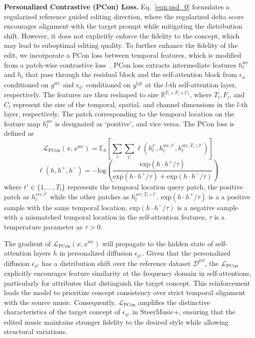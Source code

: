 \textbf{Personalized Contrastive (PCon) Loss.}
Eq.~\ref{eqn:psd_0} formulates a regularized reference guided editing direction, where the regularized delta score encourages alignment with the target prompt while mitigating the distribution shift.
However, it does not explicitly enforce the fidelity to the concept, which may lead to suboptimal editing quality.
To further enhance the fidelity of the edit, 
we incorporate a PCon loss between temporal features, which is modified from a patch-wise contrastive loss~\cite{nam2024contrastive}. PCon loss extracts intermediate features $h^{\text{src}}_l$ and $h_l$ that pass through the residual block and the self-attention block from $\epsilon_{\phi}$ conditioned on $y^{\text{src}}$ and $\epsilon_{\phi '}$ conditioned on $y^{\text{tgt}}$ at the $l$-th self-attention layer, respectively. The features are then reshaped to size $\mathbb{R}^{T_l \times F_l \times C_l}$, where $T_l,F_l$, and $C_l$ represent the size of the temporal, spatial, and channel dimensions in the $l$-th layer, respectively. The patch corresponding to the temporal location on the feature map $h^{\text{src}}_l$ is designated as `positive', and vice versa. The PCon loss is defined as
\begin{equation}
    \mathcal{L}_{\text{PCon}}(x,x^{\text{src}}) = \mathbb{E}_{h} [\sum_l \sum_{t'} \ell(h_l^{t'},h_l^{\text{src},t'},h_l^{\text{src},T_l\backslash t'})] \label{eqn:patch_personal}
\end{equation}
\begin{equation}
    \ell(h,h^+,h^-) = -\text{log}(\frac{\text{exp}(h\cdot h^+/\tau)}{\text{exp}(h\cdot h^+/\tau)+ \text{exp}(h\cdot h^-/\tau)})  \nonumber
\end{equation}
where $t' \in \{1,...,T_l\}$ represents the temporal location query patch, the positive patch as $h_l^{src,t'}$ while the other patches as $h_l^{src,T_l\backslash t'}$. $\text{exp}(h\cdot h^+/\tau)$ is a a positive sample with the same temporal location, $\text{exp}(h\cdot h^-/\tau)$ is a negative sample with a mismatched temporal location in the self-attention features, $\tau$ is a temperature parameter 
as $\tau >0$.

The gradient of $\mathcal{L}_{\text{PCon}}(x,x^{\text{src}})$ will propagate to the hidden state of self-attention layers $h$ in personalized diffusion $\epsilon_{\phi '}$. Given that the personalized diffusion $\epsilon_{\phi '}$ has a distribution shift over the reference dataset $\mathcal{D}^{\text{ref}}$, the $\mathcal{L}_{\text{PCon}}$ explicitly encourages feature similarity at the frequency domain in self-attentions, particularly for attributes that distinguish the target concept. This reinforcement leads the model to prioritize concept consistency over strict temporal alignment with the source music. Consequently, $\mathcal{L}_{\text{PCon}}$ amplifies the distinctive characteristics of the target concept of $\epsilon_{\phi '}$ in SteerMusic+, ensuring that the edited music maintains stronger fidelity to the desired style while allowing structural variations.


